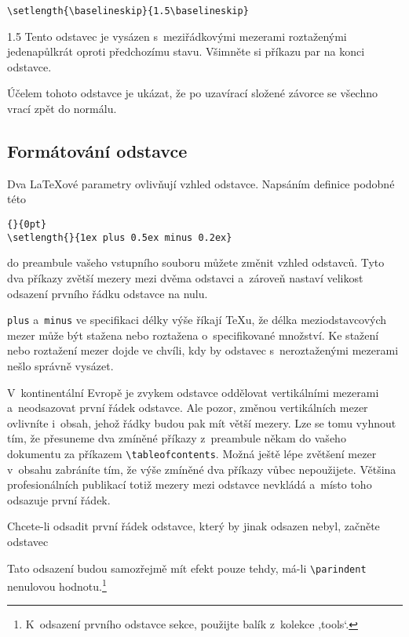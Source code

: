 \begin{lscommand}
\verb|\setlength{\baselineskip}{1.5\baselineskip}|
\end{lscommand}

\begin{example}
{\setlength{\baselineskip}%
           {1.5\baselineskip}
Tento odstavec je vysázen
s~meziřádkovými mezerami
roztaženými jedenapůlkrát
oproti předchozímu stavu.
Všimněte si příkazu par
na konci odstavce.\par}

Účelem tohoto odstavce je
ukázat, že po uzavírací
složené závorce se všechno
vrací zpět do normálu.
\end{example}

\subsection{Formátování odstavce}\label{parsp}

Dva \LaTeX ové parametry ovlivňují vzhled odstavce. Napsáním definice
podobné této

\begin{code}
\verb|{|\verb|}{0pt}| \\
\verb|\setlength{|\verb|}{1ex plus 0.5ex minus 0.2ex}|
\end{code}
do preambule vašeho vstupního souboru můžete změnit vzhled odstavců.
Tyto dva příkazy zvětší mezery mezi dvěma odstavci a~zároveň
nastaví velikost odsazení prvního řádku odstavce na nulu.

\texttt{plus} a~\texttt{minus} ve specifikaci délky výše říkají
\TeX u, že délka meziodstavcových mezer může být stažena nebo roztažena
o~specifikované množství. Ke stažení nebo roztažení mezer dojde
ve chvíli, kdy by odstavec s~neroztaženými mezerami nešlo správně vysázet.

V~kontinentální Evropě je zvykem odstavce oddělovat vertikálními mezerami
a~neodsazovat první řádek odstavce. Ale pozor, změnou vertikálních
mezer ovlivníte i~obsah, jehož řádky budou pak mít větší mezery.
Lze se tomu vyhnout tím, že přesuneme dva zmíněné příkazy z~preambule
někam do vašeho dokumentu za příkazem \verb|\tableofcontents|.
Možná ještě lépe zvětšení mezer v~obsahu zabráníte tím, že výše zmíněné dva
příkazy vůbec nepoužijete. Většina profesionálních publikací totiž
mezery mezi odstavce nevkládá a~místo toho odsazuje první řádek.
 
Chcete-li odsadit první řádek odstavce, který by jinak odsazen nebyl,
začněte odstavec
\begin{lscommand}
\end{lscommand}
\noindent Tato odsazení
budou samozřejmě mít efekt pouze tehdy, má-li \verb|\parindent|
nenulovou hodnotu.\footnote{K~odsazení prvního odstavce sekce, použijte
balík  z~kolekce ,tools`.}

